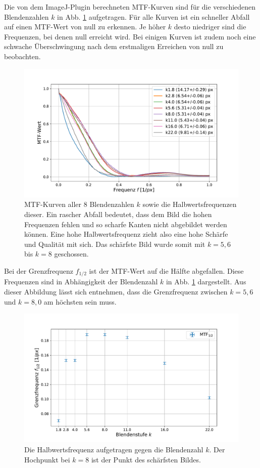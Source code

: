 		Die von dem ImageJ-Plugin berechneten MTF-Kurven sind für die verschiedenen Blendenzahlen $k$ in Abb. \ref{fig:kStufen} aufgetragen.
		Für alle Kurven ist ein schneller Abfall auf einen MTF-Wert von null zu erkennen.
		Je höher $k$ desto niedriger sind die Frequenzen, bei denen null erreicht wird.
		Bei einigen Kurven ist zudem noch eine schwache Überschwingung nach dem erstmaligen Erreichen von null zu beobachten.
		\begin{figure}[ht]
			\centering
			\includegraphics[width=1\textwidth]{data/kStufen.pdf}
			\caption{MTF-Kurven aller 8 Blendenzahlen $k$ sowie die Halbwertsfrequenzen dieser. Ein rascher Abfall bedeutet, dass dem Bild die hohen Frequenzen fehlen und so scharfe Kanten nicht abgebildet werden können. Eine hohe Halbwertsfrequenz zieht also eine hohe Schärfe und Qualität mit sich. Das schärfste Bild wurde somit mit $k=5,6$ bis $k = 8$ geschossen.}
			\label{fig:kStufen}	
		\end{figure}
		Bei der Grenzfrequenz $f_{1/2}$ ist der MTF-Wert auf die Hälfte abgefallen.
		Diese Frequenzen sind in Abhängigkeit der Blendenzahl $k$ in Abb. \ref{fig:kStufen} dargestellt.
		Aus dieser Abbildung lässt sich entnehmen, dass die Grenzfrequenz zwischen $k = 5,6$ und $k = 8,0$ am höchsten sein muss.
		\begin{figure}[ht]
			\centering
			\includegraphics[width=1\textwidth]{data/kHalbe.pdf}
			\caption{Die Halbwertsfrequenz aufgetragen gegen die Blendenzahl $k$. Der Hochpunkt bei $k = 8$ ist der Punkt des schärfsten Bildes.}
			\label{fig:kHalbe}	
		\end{figure}
	
